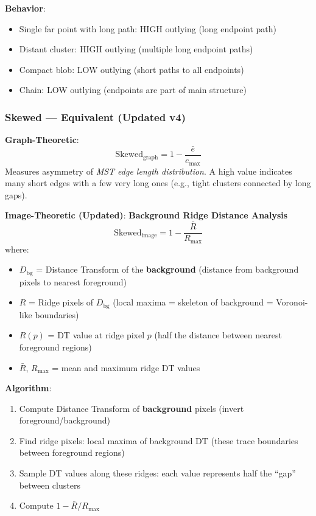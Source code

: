 \documentclass[11pt]{article}
\begin{document}
\textbf{Behavior}:
\begin{itemize}
    \item Single far point with long path: HIGH outlying (long endpoint path)
    \item Distant cluster: HIGH outlying (multiple long endpoint paths)
    \item Compact blob: LOW outlying (short paths to all endpoints)
    \item Chain: LOW outlying (endpoints are part of main structure)
\end{itemize}

\subsubsection{Skewed — \textcolor{equivalent}{Equivalent} (Updated v4)}

\textbf{Graph-Theoretic}:
\begin{equation}
    \text{Skewed}_{\text{graph}} = 1 - \frac{\bar{e}}{e_{\max}}
\end{equation}
Measures asymmetry of \textit{MST edge length distribution}. A high value indicates many short edges with a few very long ones (e.g., tight clusters connected by long gaps).

\textbf{Image-Theoretic (Updated)}: \textbf{Background Ridge Distance Analysis}
\begin{equation}
    \text{Skewed}_{\text{image}} = 1 - \frac{\bar{R}}{R_{\max}}
\end{equation}
where:
\begin{itemize}
    \item $D_{\text{bg}}$ = Distance Transform of the \textbf{background} (distance from background pixels to nearest foreground)
    \item $R$ = Ridge pixels of $D_{\text{bg}}$ (local maxima = skeleton of background = Voronoi-like boundaries)
    \item $R(p)$ = DT value at ridge pixel $p$ (half the distance between nearest foreground regions)
    \item $\bar{R}$, $R_{\max}$ = mean and maximum ridge DT values
\end{itemize}

\textbf{Algorithm}:
\begin{enumerate}
    \item Compute Distance Transform of \textbf{background} pixels (invert foreground/background)
    \item Find ridge pixels: local maxima of background DT (these trace boundaries between foreground regions)
    \item Sample DT values along these ridges: each value represents half the ``gap'' between clusters
    \item Compute $1 - \bar{R} / R_{\max}$
\end{enumerate}
\end{document}
